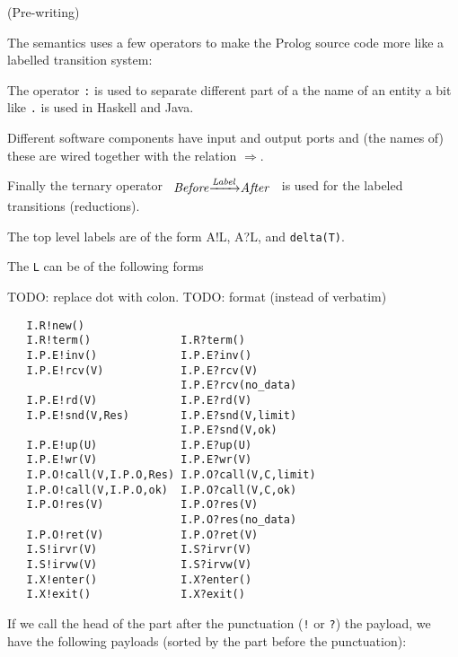 \newcommand{\Preduce}[3]{\ensuremath{#1 &\xrightarrow{#2}& #3}}
\newcommand{\Pignore}[1]{\ensuremath{\mathit{ignore}#1}}
\newcommand{\Pif}{\ensuremath{\mathbin{:\!\!-}}}
\newcommand{\Psay}[2]{#1!#2}
\newcommand{\Phear}[2]{#1?#2}


(Pre-writing)

The semantics uses a few operators to make the Prolog source code more
like a labelled transition system:

The operator \verb+:+ is used to separate different part of a the name of
an entity a bit like \verb+.+ is used in Haskell and Java.

Different software components have input and output ports and (the
names of) these are wired together with the relation
\ensuremath{\Rightarrow{}}.

Finally the ternary operator \(\begin{array}{r@{}c@{}l}\Preduce{\mathit{Before}}{\mathit{Label}}{\mathit{After}}\end{array}\) is
used for the labeled transitions (reductions).

The top level labels are of the form \Psay{A}{L},
\Phear{A}{L}, and \verb+delta(T)+.

The \verb+L+ can be of the following forms

TODO: replace dot with colon.
TODO: format (instead of verbatim)

\begin{verbatim}
   I.R!new()
   I.R!term()              I.R?term()
   I.P.E!inv()             I.P.E?inv()
   I.P.E!rcv(V)            I.P.E?rcv(V)
                           I.P.E?rcv(no_data)
   I.P.E!rd(V)             I.P.E?rd(V)
   I.P.E!snd(V,Res)        I.P.E?snd(V,limit)
                           I.P.E?snd(V,ok)
   I.P.E!up(U)             I.P.E?up(U)
   I.P.E!wr(V)             I.P.E?wr(V)
   I.P.O!call(V,I.P.O,Res) I.P.O?call(V,C,limit)
   I.P.O!call(V,I.P.O,ok)  I.P.O?call(V,C,ok)
   I.P.O!res(V)            I.P.O?res(V)
                           I.P.O?res(no_data)
   I.P.O!ret(V)            I.P.O?ret(V)
   I.S!irvr(V)             I.S?irvr(V)
   I.S!irvw(V)             I.S?irvw(V)
   I.X!enter()             I.X?enter()
   I.X!exit()              I.X?exit()
\end{verbatim}

If we call the head of the part after the punctuation (\verb+!+ or
\verb+?+) the payload, we have the following payloads (sorted by the
part before the punctuation):

